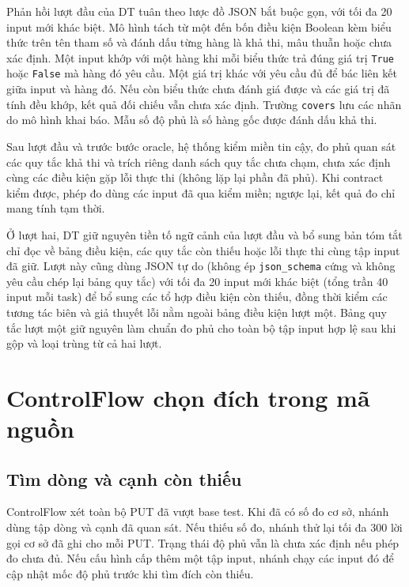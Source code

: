 Phản hồi lượt đầu của DT tuân theo lược đồ JSON bắt buộc gọn, với tối đa 20 input mới khác biệt. Mô hình tách từ một đến bốn điều kiện Boolean kèm biểu thức trên tên tham số và đánh dấu từng hàng là khả thi, mâu thuẫn hoặc chưa xác định. Một input khớp với một hàng khi mỗi biểu thức trả đúng giá trị \texttt{True} hoặc \texttt{False} mà hàng đó yêu cầu. Một giá trị khác với yêu cầu đủ để bác liên kết giữa input và hàng đó. Nếu còn biểu thức chưa đánh giá được và các giá trị đã tính đều khớp, kết quả đối chiếu vẫn chưa xác định. Trường \texttt{covers} lưu các nhãn do mô hình khai báo. Mẫu số độ phủ là số hàng gốc được đánh dấu khả thi.

Sau lượt đầu và trước bước oracle, hệ thống kiểm miền tin cậy, đo phủ quan sát các quy tắc khả thi và trích riêng danh sách quy tắc chưa chạm, chưa xác định cùng các điều kiện gặp lỗi thực thi (không lặp lại phần đã phủ). Khi contract kiểm được, phép đo dùng các input đã qua kiểm miền; ngược lại, kết quả đo chỉ mang tính tạm thời.

Ở lượt hai, DT giữ nguyên tiền tố ngữ cảnh của lượt đầu và bổ sung bản tóm tắt chỉ đọc về bảng điều kiện, các quy tắc còn thiếu hoặc lỗi thực thi cùng tập input đã giữ. Lượt này cũng dùng JSON tự do (không ép \texttt{json\_schema} cứng và không yêu cầu chép lại bảng quy tắc) với tối đa 20 input mới khác biệt (tổng trần 40 input mỗi task) để bổ sung các tổ hợp điều kiện còn thiếu, đồng thời kiểm các tương tác biên và giả thuyết lỗi nằm ngoài bảng điều kiện lượt một. Bảng quy tắc lượt một giữ nguyên làm chuẩn đo phủ cho toàn bộ tập input hợp lệ sau khi gộp và loại trùng từ cả hai lượt.

\section{ControlFlow chọn đích trong mã nguồn}
\label{sec:control-flow}

\subsection{Tìm dòng và cạnh còn thiếu}

ControlFlow xét toàn bộ PUT đã vượt base test. Khi đã có số đo cơ sở, nhánh dùng tập dòng và cạnh đã quan sát. Nếu thiếu số đo, nhánh thử lại tối đa 300 lời gọi cơ sở đã ghi cho mỗi PUT. Trạng thái độ phủ vẫn là chưa xác định nếu phép đo chưa đủ. Nếu cấu hình cấp thêm một tập input, nhánh chạy các input đó để cập nhật mốc độ phủ trước khi tìm đích còn thiếu.

